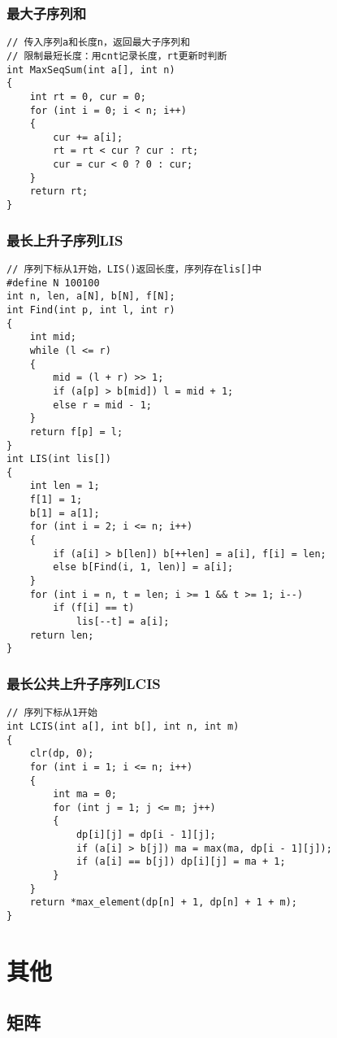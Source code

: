 \documentclass[a4]{article}
\begin{document}
\subsubsection{最大子序列和}
\begin{lstlisting}
// 传入序列a和长度n，返回最大子序列和
// 限制最短长度：用cnt记录长度，rt更新时判断
int MaxSeqSum(int a[], int n)
{
    int rt = 0, cur = 0;
    for (int i = 0; i < n; i++)
    {
        cur += a[i];
        rt = rt < cur ? cur : rt;
        cur = cur < 0 ? 0 : cur;
    }
    return rt;
}
\end{lstlisting}
\subsubsection{最长上升子序列LIS}
\begin{lstlisting}
// 序列下标从1开始，LIS()返回长度，序列存在lis[]中
#define N 100100
int n, len, a[N], b[N], f[N];
int Find(int p, int l, int r)
{
    int mid;
    while (l <= r)
    {
        mid = (l + r) >> 1;
        if (a[p] > b[mid]) l = mid + 1;
        else r = mid - 1;
    }
    return f[p] = l;
}
int LIS(int lis[])
{
    int len = 1;
    f[1] = 1;
    b[1] = a[1];
    for (int i = 2; i <= n; i++)
    {
        if (a[i] > b[len]) b[++len] = a[i], f[i] = len;
        else b[Find(i, 1, len)] = a[i];
    }
    for (int i = n, t = len; i >= 1 && t >= 1; i--)
        if (f[i] == t)
            lis[--t] = a[i];
    return len;
}
\end{lstlisting}
\subsubsection{最长公共上升子序列LCIS}
\begin{lstlisting}
// 序列下标从1开始
int LCIS(int a[], int b[], int n, int m)
{
    clr(dp, 0);
    for (int i = 1; i <= n; i++)
    {
        int ma = 0;
        for (int j = 1; j <= m; j++)
        {
            dp[i][j] = dp[i - 1][j];
            if (a[i] > b[j]) ma = max(ma, dp[i - 1][j]);
            if (a[i] == b[j]) dp[i][j] = ma + 1;
        }
    }
    return *max_element(dp[n] + 1, dp[n] + 1 + m);
}
\end{lstlisting}
\clearpage\section{其他}
\subsection{矩阵}
\end{document}
